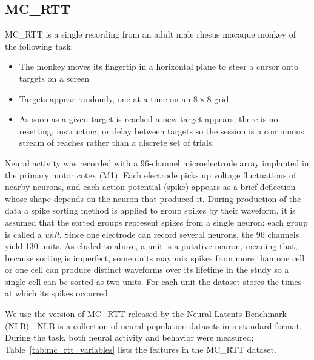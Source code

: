 \documentclass[10pt]{article}
\begin{document}
\subsection{MC\_RTT}

MC\_RTT is a single recording from an adult male rhesus macaque monkey of the following task:

\begin{itemize}
  \item The monkey moves its fingertip in a horizontal plane to steer a cursor onto targets on a screen
  \item Targets appear randomly, one at a time on an $8 \times 8$ grid
  \item As soon as a given target is reached a new target appears; there is no resetting, instructing, or delay between targets so the session is a continuous stream of reaches rather than a discrete set of trials.
\end{itemize}

Neural activity was recorded with a 96-channel microelectrode array implanted in the primary motor cotex (M1).
Each electrode picks up voltage fluctuations of nearby neurons, and each action potential (spike) appears as a brief deflection whose shape depends on the neuron that produced it.
During production of the data a spike sorting method is applied to group spikes by their waveform, it is assumed that the sorted groups represent spikes from a single neuron; each group is called a \emph{unit}.
Since one electrode can record several neurons, the 96 channels yield 130 units.
As eluded to above, a unit is a putative neuron, meaning that, because sorting is imperfect, some units may mix spikes from more than one cell or one cell can produce distinct waveforms over its lifetime in the study so a single cell can be sorted as two units.
For each unit the dataset stores the times at which its spikes occurred.

We use the version of MC\_RTT released by the Neural  Latents Benchmark (NLB) \citep{pei2021nlb}.
NLB is a collection of neural population datasets in a standard format.
During the task, both neural activity and behavior were measured; Table~\ref{tab:mc_rtt_variables} lists the features in the MC\_RTT dataset.
\end{document}
